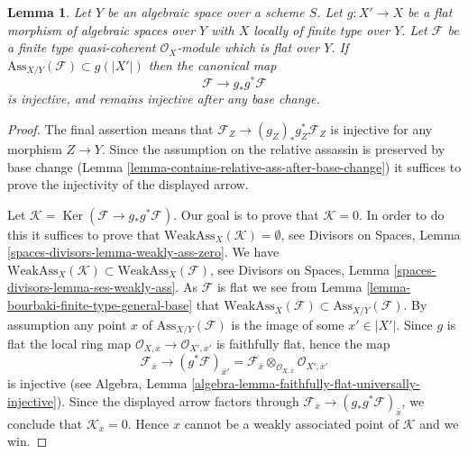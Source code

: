 \documentclass{stacks-project}
\theoremstyle{plain}
\newtheorem{lemma}[subsection]{Lemma}
\theoremstyle{definition}
\theoremstyle{remark}
\numberwithin{equation}{subsection}
\def\Ker{\mathop{\mathrm{Ker}}}
\begin{document}
\begin{lemma}
\label{lemma-universally-separating}
Let $Y$ be an algebraic space over a scheme $S$.
Let $g : X' \to X$ be a flat morphism of algebraic spaces over $Y$
with $X$ locally of finite type over $Y$.
Let $\mathcal{F}$ be a finite type quasi-coherent $\mathcal{O}_X$-module
which is flat over $Y$. If $\text{Ass}_{X/Y}(\mathcal{F}) \subset g(|X'|)$
then the canonical map
$$
\mathcal{F} \longrightarrow g_*g^*\mathcal{F}
$$
is injective, and remains injective after any base change.
\end{lemma}

\begin{proof}
The final assertion means that $\mathcal{F}_Z \to (g_Z)_*g_Z^*\mathcal{F}_Z$
is injective for any morphism $Z \to Y$. Since the assumption on
the relative assassin is preserved by base change
(Lemma \ref{lemma-contains-relative-ass-after-base-change})
it suffices to prove the injectivity of the displayed arrow.

\medskip\noindent
Let $\mathcal{K} = \Ker(\mathcal{F} \to g_*g^*\mathcal{F})$.
Our goal is to prove that $\mathcal{K} = 0$.
In order to do this it suffices to prove that
$\text{WeakAss}_X(\mathcal{K}) = \emptyset$, see
Divisors on Spaces, Lemma \ref{spaces-divisors-lemma-weakly-ass-zero}.
We have
$\text{WeakAss}_X(\mathcal{K}) \subset \text{WeakAss}_X(\mathcal{F})$, see
Divisors on Spaces, Lemma \ref{spaces-divisors-lemma-ses-weakly-ass}.
As $\mathcal{F}$ is flat we see from
Lemma \ref{lemma-bourbaki-finite-type-general-base}
that $\text{WeakAss}_X(\mathcal{F}) \subset \text{Ass}_{X/Y}(\mathcal{F})$.
By assumption any point $x$ of $\text{Ass}_{X/Y}(\mathcal{F})$
is the image of some $x' \in |X'|$. Since $g$ is flat the
local ring map
$\mathcal{O}_{X, \overline{x}} \to \mathcal{O}_{X', \overline{x}'}$
is faithfully flat, hence the map
$$
\mathcal{F}_{\overline{x}}
\longrightarrow
(g^*\mathcal{F})_{\overline{x}'} =
\mathcal{F}_{\overline{x}} \otimes_{\mathcal{O}_{X, \overline{x}}}
\mathcal{O}_{X', \overline{x}'}
$$
is injective (see
Algebra, Lemma \ref{algebra-lemma-faithfully-flat-universally-injective}).
Since the displayed arrow factors through
$\mathcal{F}_{\overline{x}} \to (g_*g^*\mathcal{F})_{\overline{x}}$,
we conclude that
$\mathcal{K}_{\overline{x}} = 0$. Hence $x$ cannot be a weakly associated
point of $\mathcal{K}$ and we win.
\end{proof}
\end{document}
